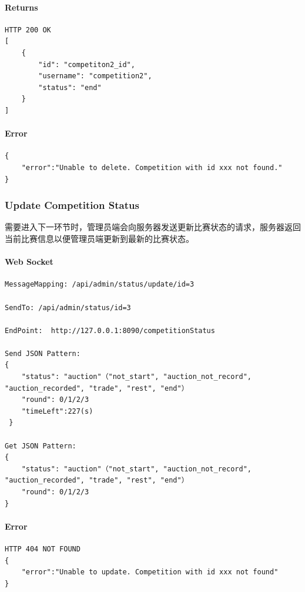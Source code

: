 \documentclass{article}
\begin{document}
\paragraph*{Returns}
\begin{lstlisting}
HTTP 200 OK
[
    {
        "id": "competiton2_id",
        "username": "competition2",
        "status": "end"
    }
]
\end{lstlisting}

\paragraph*{Error}
\begin{lstlisting}
{
    "error":"Unable to delete. Competition with id xxx not found."
}
\end{lstlisting}

\subsubsection{Update Competition Status}

需要进入下一环节时，管理员端会向服务器发送更新比赛状态的请求，服务器返回当前比赛信息以便管理员端更新到最新的比赛状态。

\paragraph*{Web Socket}
\begin{lstlisting}
MessageMapping: /api/admin/status/update/id=3

SendTo: /api/admin/status/id=3

EndPoint:  http://127.0.0.1:8090/competitionStatus

Send JSON Pattern:
{
    "status": "auction"（"not_start", "auction_not_record", "auction_recorded", "trade", "rest", "end"）
    "round": 0/1/2/3
    "timeLeft":227(s)
 }

Get JSON Pattern:
{
    "status": "auction"（"not_start", "auction_not_record", "auction_recorded", "trade", "rest", "end"）
    "round": 0/1/2/3
}
\end{lstlisting}

\paragraph*{Error}
\begin{lstlisting}
HTTP 404 NOT FOUND
{
    "error":"Unable to update. Competition with id xxx not found"
}
\end{lstlisting}
\end{document}
